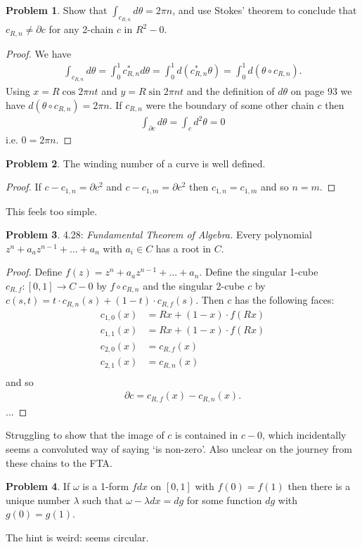 \documentclass[20pt]{article}
\theoremstyle{plain}
\theoremstyle{definition}
\newtheorem*{problem}{Problem}
\begin{document}
\begin{problem}{4.26}
	Show that $\int_{c_{R, n}} d\theta = 2\pi n$, and use Stokes' theorem to conclude that $c_{R, n} \neq \partial c$
	 for any 2-chain $c$ in $R^2 - 0$.
\end{problem}

\begin{proof}
	We have
	\begin{align*}
		\int_{c_{R, n}} d\theta =
		\int_0^1 c_{R, n}^* d \theta =
		\int_0^1 d(c_{R, n}^* \theta) =
		\int_0^1 d(\theta \circ c_{R, n}).
	\end{align*}
	Using $x = R \cos 2 \pi n t$ and $y = R \sin 2 \pi n t$ and the definition of $d \theta$
	on page 93 we have $d(\theta \circ c_{R, n}) = 2 \pi n.$
	If $c_{R, n}$ were the boundary of some other chain $c$ then
	\begin{align*}
		\int_{\partial c} d\theta = \int_c d^2 \theta = 0
	\end{align*}
	i.e. $0 = 2 \pi n$.
\end{proof}













\begin{problem}{4.27}
	The winding number of a curve is well defined.
\end{problem}

\begin{proof}
	If $c - c_{1, n} = \partial c^2$ and $c - c_{1, m} = \partial c^2$ then
	$c_{1, n} = c_{1, m}$ and so $n = m$.
\end{proof}
{\color{Blue} This feels too simple.}


\begin{problem}{4.28: \textit{Fundamental Theorem of Algebra.}}
	Every polynomial $z^n + a_az^{n-1} + ... + a_n$ with $a_i \in C$ has a root in $C$.
\end{problem}
\begin{proof}
	Define $f(z) = z^n + a_az^{n-1} + ... + a_n$.
	Define the singular 1-cube $c_{R, f}: [0, 1] \to C - 0$ by $f \circ c_{R, n}$
	and the singular 2-cube $c$ by $c(s, t) = t \cdot c_{R, n}(s)  + (1-t) \cdot c_{R,f}(s).$
	Then $c$ has the following faces:
	\begin{align*}
		c_{1, 0}(x) &= Rx + (1-x) \cdot f(Rx)\\
		c_{1, 1}(x) &= Rx + (1-x) \cdot f(Rx)\\
		c_{2, 0}(x) &= c_{R, f}(x)\\
		c_{2, 1}(x) &= c_{R, n}(x)\\
	\end{align*}
	and so
	\begin{align*}
		\partial c = c_{R, f}(x) - c_{R, n}(x).
	\end{align*}
	...
\end{proof}
{\color{Blue} Struggling to show that the image of $c$ is contained in $c - 0$, which
incidentally seems a convoluted way of saying `is non-zero'.
Also unclear on the journey from these chains to the FTA.}


\begin{problem}{4.29}
	If $\omega$ is a 1-form $f dx$ on $[0,1]$ with $f(0) = f(1)$ then there is a unique number
	$\lambda$ such that $\omega - \lambda dx = dg$ for some function $dg$ with
	$g(0) = g(1)$.
\end{problem}
{\color{Blue} The hint is weird: seems circular.}
\end{document}
